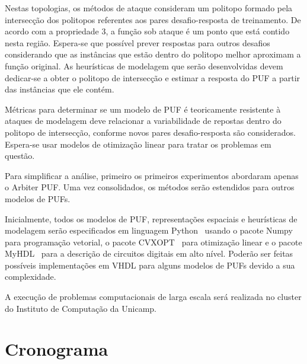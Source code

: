 \documentclass[pdftex,12pt]{article}
\begin{document}
\begin{spacing}{1.5}
Nestas topologias, os métodos de ataque consideram um politopo formado pela intersecção dos politopos referentes aos pares desafio-resposta de treinamento. De acordo com a propriedade 3, a função sob ataque é um ponto que está contido nesta região. Espera-se que possível prever respostas para outros desafios considerando que as instâncias que estão dentro do politopo melhor aproximam a função original. As heurísticas de modelagem que serão desenvolvidas devem dedicar-se a obter o politopo de intersecção e estimar a resposta do PUF a partir das instâncias que ele contém.

Métricas para determinar se um modelo de PUF é teoricamente resistente à ataques de modelagem deve relacionar a variabilidade de repostas dentro do politopo de intersecção, conforme novos pares desafio-resposta são considerados. Espera-se usar modelos de otimização linear para tratar os problemas em questão.

Para simplificar a análise, primeiro os primeiros experimentos abordaram apenas o Arbiter PUF. Uma vez consolidados, os métodos serão estendidos para outros modelos de PUFs.

Inicialmente, todos os modelos de PUF, representações espaciais e heurísticas de modelagem serão especificados em linguagem Python~\cite{} usando o pacote Numpy~\cite{} para programação vetorial, o pacote CVXOPT~\cite{} para otimização linear e o pacote MyHDL~\cite{} para a descrição de circuitos digitais em alto nível. Poderão ser feitas possíveis implementações em VHDL para alguns modelos de PUFs devido a sua complexidade.

A execução de problemas computacionais de larga escala será realizada no cluster do Instituto de Computação da Unicamp.


\section{Cronograma}\label{sec:cronograma}


\end{spacing}
\end{document}
